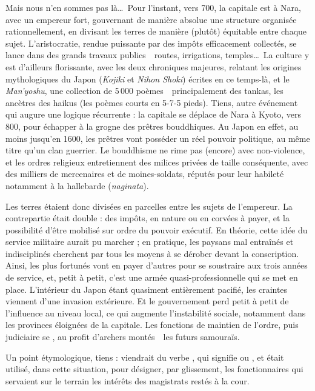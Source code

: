 Mais nous n'en sommes pas là\dots\ Pour l'instant, vers 700, la capitale est à
Nara, avec un empereur fort, gouvernant de manière absolue une structure
organisée rationnellement, en divisant les terres de manière (plutôt) équitable
entre chaque sujet. L'aristocratie, rendue puissante par des impôts
efficacement collectés, se lance dans des grands travaux
publics~\incise~routes, irrigations, temples\dots\ La culture y est d'ailleurs
florissante, avec les deux chroniques majeures, relatant les origines
mythologiques du Japon (\emph{Kojiki} et \emph{Nihon Shoki}) écrites en ce
temps-là, et le \emph{Man'yoshu}, une collection de 5\,000
poèmes~\incise~principalement des tankas, les ancètres des haikus (les poèmes
courts en 5-7-5 pieds). Tiens, autre événement qui augure une logique
récurrente : la capitale se déplace de Nara à Kyoto, vers 800, pour échapper à
la grogne des prêtres bouddhiques. Au Japon en effet, au moins jusqu'en 1600,
les prêtres vont posséder un réel pouvoir politique, au même titre qu'un clan
guerrier. Le bouddhisme ne rime pas (encore) avec non-violence, et les ordres
religieux entretiennent des milices privées de taille conséquente, avec des
milliers de mercenaires et de moines-soldats, réputés pour leur habileté
notamment à la hallebarde (\emph{naginata}).

Les terres étaient donc divisées en parcelles entre les sujets de l'empereur.
La contrepartie était double : des impôts, en nature ou en corvées à payer, et
la possibilité d'être mobilisé sur ordre du pouvoir exécutif. En théorie, cette
idée du service militaire aurait pu marcher ; en pratique, les paysans mal
entraînés et indisciplinés cherchent par tous les moyens à se dérober devant la
conscription. Ainsi, les plus fortunés vont en payer d'autres pour se
soustraire aux trois années de service, et, petit à petit, c'est une armée
quasi-professionnelle qui se met en place. L'intérieur du Japon étant quasiment
entièrement pacifié, les craintes viennent d'une invasion extérieure. Et le
gouvernement perd petit à petit de l'influence au niveau local, ce qui augmente
l'instabilité sociale, notamment dans les provinces éloignées de la capitale.
Les fonctions de maintien de l'ordre, puis judiciaire se , au
profit d'archers montés~\incise~les futurs samouraïs.

Un point étymologique, tiens :  viendrait du verbe
, qui signifie  ou , et
était utilisé, dans cette situation, pour désigner, par glissement, les
fonctionnaires qui servaient sur le terrain les intérêts des magistrats restés
à la cour.

